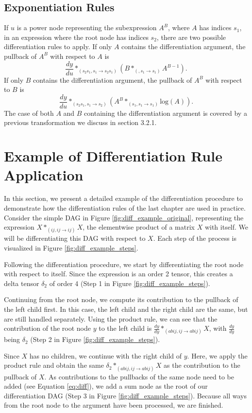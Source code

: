 \documentclass[12pt, a4paper]{report} %
\begin{document}
\subsection{Exponentiation Rules}
If $u$ is a power node representing the subexpression $A^B$, where $A$ has indices $s_1$, in an expression where the root node has indices $s_2$, there are two possible differentiation rules to apply.
If only $A$ contains the differentiation argument, the pullback of $A^B$ with respect to $A$ is 
$$
\frac{dy}{du} *_{(s_2 s_1, s_1 \rightarrow s_2 s_1)} (B *_{(, s_1 \rightarrow s_1)} A^{B-1}).
$$
If only $B$ contains the differentiation argument, the pullback of $A^B$ with respect to $B$ is
$$
\frac{dy}{du} *_{(s_2 s_1, s_1 \rightarrow s_2)} (A^B *_{(s_1, s_1 \rightarrow s_1)} \text{log}(A)).
$$
The case of both $A$ and $B$ containing the differentiation argument is covered by a previous transformation we discuss in section 3.2.1.


\FloatBarrier
\section{Example of Differentiation Rule Application}
In this section, we present a detailed example of the differentiation procedure to demonstrate how the differentiation rules of the last chapter are used in practice.
Consider the simple DAG in Figure \ref{fig:diff_example_original}, representing the expression $X *_{(ij,ij \rightarrow ij)} X$, the elementwise product of a matrix $X$ with itself.
We will be differentiating this DAG with respect to $X$.
Each step of the process is visualized in Figure \ref{fig:diff_example_steps}.

Following the differentiation procedure, we start by differentiating the root node with respect to itself.
Since the expression is an order 2 tensor, this creates a delta tensor $\delta_2$ of order 4 (Step 1 in Figure \ref{fig:diff_example_steps}).

Continuing from the root node, we compute its contribution to the pullback of the left child first.
In this case, the left child and the right child are the same, but are still handled separately.
Using the product rule, we can see that the contribution of the root node $y$ to the left child is $\frac{dy}{dy} *_{(abij,ij \rightarrow abij)} X$, with $\frac{dy}{dy}$ being $\delta_2$ (Step 2 in Figure \ref{fig:diff_example_steps}).

Since $X$ has no children, we continue with the right child of $y$.
Here, we apply the product rule and obtain the same $\delta_2 *_{(abij,ij \rightarrow abij)} X$ as the contribution to the pullback of $X$.
As contributions to the pullbacks of the same node need to be added (see Equation \ref{eq:diff}), we add a sum node as the root of our differentiation DAG (Step 3 in Figure \ref{fig:diff_example_steps}).
Because all ways from the root node to the argument have been processed, we are finished.
\end{document}

